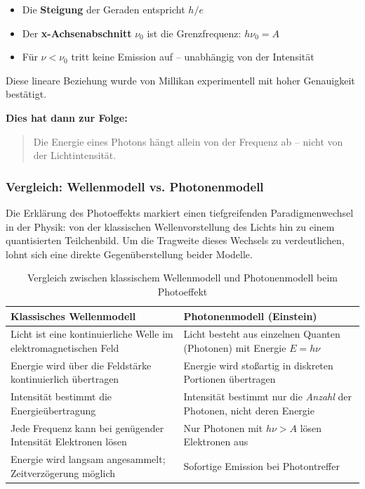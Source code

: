 \begin{itemize}
	\item Die \textbf{Steigung} der Geraden entspricht \( h/e \)
	\item Der \textbf{x-Achsenabschnitt} \( \nu_0 \) ist die Grenzfrequenz: \( h \nu_0 = A \)
	\item Für \( \nu < \nu_0 \) tritt keine Emission auf – unabhängig von der Intensität
\end{itemize}

Diese lineare Beziehung wurde von Millikan experimentell mit hoher Genauigkeit bestätigt.

\textbf{Dies hat dann zur Folge:}

\begin{quote}
	Die Energie eines Photons hängt allein von der Frequenz ab – nicht von der Lichtintensität.
\end{quote}
\subsubsection{ Vergleich: Wellenmodell vs. Photonenmodell}

Die Erklärung des Photoeffekts markiert einen tiefgreifenden Paradigmenwechsel in der Physik: von der klassischen Wellenvorstellung des Lichts hin zu einem quantisierten Teilchenbild. Um die Tragweite dieses Wechsels zu verdeutlichen, lohnt sich eine direkte Gegenüberstellung beider Modelle.

\medskip
\begin{table}[H]
	\centering
	\begin{tabular}{|p{4.75cm}|p{4.75cm}|} %
		\hline
		\textbf{Klassisches Wellenmodell} & \textbf{Photonenmodell (Einstein)} \\
		\hline
		Licht ist eine kontinuierliche Welle im elektromagnetischen Feld & Licht besteht aus einzelnen Quanten (Photonen) mit Energie \( E = h\nu \) \\
		\hline
		Energie wird über die Feldstärke kontinuierlich übertragen & Energie wird stoßartig in diskreten Portionen übertragen \\
		\hline
		Intensität bestimmt die Energieübertragung & Intensität bestimmt nur die \emph{Anzahl} der Photonen, nicht deren Energie \\
		\hline
		Jede Frequenz kann bei genügender Intensität Elektronen lösen & Nur Photonen mit \( h\nu > A \) lösen Elektronen aus \\
		\hline
		Energie wird langsam angesammelt; Zeitverzögerung möglich & Sofortige Emission bei Photontreffer \\
		\hline
	\end{tabular}
	\caption{Vergleich zwischen klassischem Wellenmodell und Photonenmodell beim Photoeffekt}
	\label{tab:vergleich_photoeffekt}
\end{table}

